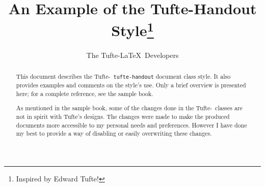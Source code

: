 \documentclass[a4paper]{tufte-handout}
\title{An Example of the Tufte-Handout Style\thanks{Inspired by Edward Tufte!}}
\author[The Tufte-LaTeX Developers]{The Tufte-\LaTeX\ Developers}
\newcommand{\TL}{Tufte-\hologo{LaTeX}\xspace}
\newcommand{\doccls}[1]{\texttt{#1}}
\begin{document}
\maketitle

\begin{abstract}
  \noindent
  This document describes the \TL\ \doccls{tufte-handout} document class style.
  It also provides examples and comments on the style's use.
  Only a brief overview is presented here;  for a complete reference, see the sample book.

  As mentioned in the sample book, some of the changes done in the \TL\ classes are not in spirit with Tufte's designs.
  The changes were made to make the produced documents more accessible to my personal needs and preferences.
  However I have done my best to provide a way of disabling or easily overwriting these changes.
\end{abstract}
\end{document}
